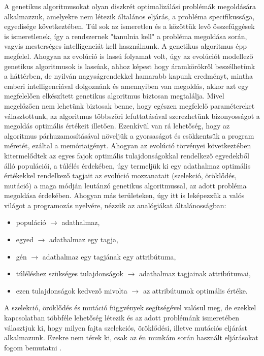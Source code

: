 A genetikus algoritmusokat olyan diszkrét optimalizálási problémák megoldására alkalmazzuk,
amelyekre nem létezik általános eljárás, a probléma specifikussága, egyedisége következtében.
Túl sok az ismeretlen és a közöttük levő összefüggések is ismeretlenek, így a rendszernek 
"tanulnia kell" a probléma megoldása során, vagyis mesterséges intelligenciát kell 
használnunk. A genetikus algoritmus épp megfelel. Ahogyan az evolúció is lassú folyamat volt,
úgy az evolúciót modellező genetikus algoritmusok is lassúak, ahhoz képest hogy áramkörökről
beszélhetünk a háttérben, de nyilván nagyságrendekkel hamarabb kapunk eredményt, mintha emberi
intelligenciával dolgoznánk és amennyiben van megoldás, akkor azt egy megfelelően elkészített
genetikus algoritmus biztosan megtalálja. Mivel megelőzően nem lehetünk biztosak benne, hogy
egészen megfelelő paramétereket választottunk, az algoritmus többszöri lefuttatásával 
szerezhetünk bizonyosságot a megoldás optimális értékeit illetően. Ezenkívül van rá lehetőség,
hogy az algoritmus párhuzamosításával növeljük a gyorsaságot és csökkentsük a program méretét,
ezáltal a memóriaigényt.
Ahogyan az evolúció törvényei következtében kitermelődtek az egyes fajok optimális 
tulajdonságokkal rendelkező egyedekből álló populációi, a túlélés érdekében, úgy termeljük ki
egy adathalmaz optimális értékekkel rendelkező tagjait az evolúció mozzanatait (szelekció,
öröklődés, mutáció) a maga módján leutánzó genetikus algoritmussal, az adott probléma 
megoldása érdekében. Ahogyan más területeken, úgy itt is leképezzük a valós világot a
programozás nyelvére, nézzük az analógiákat általánosságban:
\begin{itemize}
	\item populáció $\rightarrow$ adathalmaz,
	\item egyed $\rightarrow$ adathalmaz egy tagja,
	\item gén $\rightarrow$ adathalmaz egy tagjának egy attribútuma,
	\item túléléshez szükséges tulajdonságok $\rightarrow$ adathalmaz tagjainak attribútumai,
	\item ezen tulajdonságok kedvező mivolta $\rightarrow$ az attribútumok optimális értéke.
\end{itemize}

A szelekció, öröklődés és mutáció függvények segítségével valósul meg, de ezekkel
kapcsolatban többféle lehetőség létezik és az adott problémánk ismeretében választjuk ki,
hogy milyen fajta szelekciós, öröklődési, illetve mutációs eljárást alkalmazunk. Ezekre nem
térek ki, csak az én munkám során használt eljárásokat fogom bemutatni \cite{sivanandam2008genetic}.

